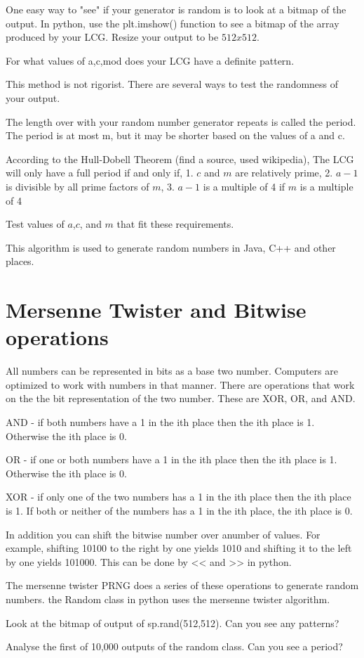 One easy way to "see" if your generator is random is to look at a bitmap of the output. In python, use the plt.imshow() function to see a bitmap of the array produced by your LCG. Resize your output to be $512 x 512$. 

\begin{problem}
For what values of a,c,mod does your LCG have a definite pattern.
\end{problem}

This method is not rigorist. There are several ways to test the randomness of your output. 

The length over with your random number generator repeats is called the period. The period is at most m, but it may be shorter based on the values of a and c.
 
According to the Hull-Dobell Theorem (find a source, used wikipedia), The LCG will only have a full period if and only if, 
1. $c$ and $m$ are relatively prime,
2. $a-1$ is divisible by all prime factors of $m$,
3. $a-1$ is a multiple of 4 if $m$ is a multiple of 4

\begin{problem}
Test values of $a$,$c$, and $m$ that fit these requirements. 
\end{problem}

This algorithm is used to generate random numbers in Java, C++ and other places.

\section*{Mersenne Twister and Bitwise operations}


All numbers can be represented in bits as a base two number. Computers are optimized to work with numbers in that manner. There are operations that work on the the bit representation of the two number. These are XOR, OR, and AND. 

AND - if both numbers have a 1 in the ith place then the ith place is 1. Otherwise the ith place is 0.

OR - if one or both numbers have a 1 in the ith place then the ith place is 1. Otherwise the ith place is 0.

XOR - if only one of the two numbers has a 1 in the ith place then the ith place is 1. If both or neither of the numbers has a 1 in the ith place, the ith place is 0.

In addition you can shift the bitwise number over anumber of values. For example, shifting 10100 to the right by one yields 1010 and shifting it to the left by one yields 101000. This can be done by << and >> in python. 


The mersenne twister PRNG does a series of these operations to generate random numbers. the Random class in python uses the mersenne twister algorithm. 

\begin{problem}
Look at the bitmap of output of sp.rand(512,512). Can you see any patterns?
\end{problem}

\begin{problem}
Analyse the first of 10,000 outputs of the random class. Can you see a period?
\end{problem}

